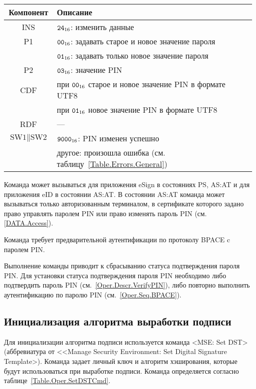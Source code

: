 \begin{table}[hbt]
\caption{}\label{Table.Oper.ChangePINCmd}
\begin{tabular}{|c|p{14cm}|}
\hline
Компонент & 	Описание \\
\hline
\hline
INS & $\texttt{24}_{16}$: изменить данные\\
\hline
P1 & $\texttt{00}_{16}$: задавать старое и новое значение пароля \\
   & $\texttt{01}_{16}$: задавать только новое значение пароля\\
\hline
P2 & $\texttt{03}_{16}$: значение PIN \\
\hline
CDF & при $\texttt{00}_{16}$ старое и новое значение PIN в формате UTF8\\
    & при $\texttt{01}_{16}$ новое значение PIN в формате UTF8\\
\hline 
RDF & 	 --- \\
\hline
$\text{SW1}\parallel\text{SW2}$ & 
 $\texttt{9000}_{16}$: PIN изменен успешно \\
  & другое: произошла ошибка (см. таблицу~\ref{Table.Errors.General})\\
\hline
\end{tabular}
\end{table}

Команда может вызываться для приложения eSign в состояниях 
PS, AS:AT и для приложения eID в состоянии AS:AT. 
В состоянии AS:AT команда может вызываться 
только авторизованным терминалом,
в сертификате которого задано право 
управлять паролем PIN или право изменять пароль 
PIN (см. \ref{DATA.Access}).

Команда требует предварительной аутентификации по 
протоколу BPACE c паролем PIN. 

Выполнение команды приводит к сбрасыванию 
статуса подтверждения пароля PIN.
Для установки статуса подтверждения пароля PIN 
необходимо либо подтвердить пароль PIN (см.~\ref{Oper.Descr.VerifyPIN}), 
либо повторно выполнить аутентификацию по паролю PIN (см.~\ref{Oper.Seq.BPACE}).


\subsection{Инициализация алгоритма выработки подписи}
\label{Oper.Descr.SetDST}

Для инициализации алгоритма подписи используется команда     
<MSE: Set DST> (аббревиатура от <<Manage Security Environment: Set 
Digital Signature Template>).
Команда задает личный ключ и алгоритм
хэширования, которые будут использоваться при выработке подписи.
Команда определяется согласно таблице~\ref{Table.Oper.SetDSTCmd}.

